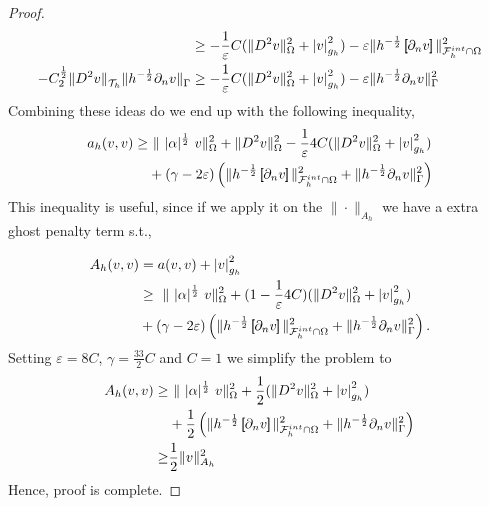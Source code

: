 \begin{proof}
\[\begin{split}
& \ge - \frac{1}{\varepsilon } C  (\| D^2 v \|_{ \Omega  }^{ 2 }  + \left\lvert  v  \right\rvert _{ g_{h} }^{2  } ) -  \varepsilon \|h^{-\frac{1}{2}} \left[\!\!\left[  \partial _{n} v  \right]\!\!\right]   \|_{ \mathcal{F}^{int}_{h}\cap \Omega   }^{2  } \\
- C_{2}^{\frac{1}{2}}  \| D^2 v \|_{ \mathcal{T} _{h} }^{  } \| h^{-\frac{1}{2}}  \partial _{n} v    \|_{ \Gamma    }^{  }
& \ge - \frac{1}{\varepsilon } C  (\| D^2 v \|_{ \Omega  }^{ 2 }  + \left\lvert  v  \right\rvert _{ g_{h} }^{2  } ) -  \varepsilon \|h^{-\frac{1}{2}}  \partial _{n} v    \|_{ \Gamma    }^{2  } \\
        \end{split}
    \]
    Combining these ideas do we end up with the following inequality,
    \[
    \begin{split}
       a_{h}( v,v)  \ge& \     \|\ |\alpha|^{\frac{1}{2}} \  v  \|_{   \Omega   }^{2} +\| D^2v  \|_{   \Omega   }^{2} -  \frac{1}{\varepsilon } 4C  (\| D^2 v \|_{ \Omega  }^{ 2 }  + \left\lvert  v  \right\rvert _{ g_{h} }^{2  } )  \\
                       & + (\gamma - 2\varepsilon  )\left( \|h^{-\frac{1}{2}}  \left[\!\!\left[  \partial _{n} v  \right]\!\!\right]\|_{\mathcal{F} _{h}^{int} \cap \Omega   }^{ 2 } + \| h^{-\frac{1}{2}} \partial _{n} v \|_{ \Gamma  }^{ 2} \right)        \\
    \end{split}
    \]
    This inequality is useful, since if we apply it on the $\| \cdot  \|_{ A_{h} }^{  } $ we have a extra ghost penalty term s.t.,

    \[
        \begin{split}
     A_{h}( v,v) & = a( v,v) + \left\lvert  v  \right\rvert_{g_{h}}^{2} \\
     &\ge  \   \| \ |\alpha|^{\frac{1}{2}} \  v  \|_{   \Omega   }^{2} + (1  - \frac{1}{\varepsilon } 4C)  (\| D^2 v \|_{ \Omega  }^{ 2 }  + \left\lvert  v  \right\rvert _{ g_{h} }^{2  } )  \\
                       & + (\gamma - 2\varepsilon  )\left( \|h^{-\frac{1}{2}}  \left[\!\!\left[  \partial _{n} v  \right]\!\!\right]\|_{\mathcal{F} _{h}^{int}\cap \Omega   }^{ 2 } + \| h^{-\frac{1}{2}} \partial _{n} v \|_{ \Gamma  }^{ 2} \right)        .
        \end{split}
    \]
    Setting $\varepsilon = 8C$, $\gamma = \frac{33}{2} C$ and $C=1$  we simplify the problem to \[
        \begin{split}
           A_{h}( v,v)  \ge& \   \| \ |\alpha|^{\frac{1}{2}} \    v  \|_{  \Omega   }^{2} + \frac{1}{2}  (\| D^2 v \|_{ \Omega  }^{ 2 }  + \left\lvert  v  \right\rvert _{ g_{h} }^{2  } )  \\
                       & + \frac{1}{2}\left( \|h^{-\frac{1}{2}}  \left[\!\!\left[  \partial _{n} v  \right]\!\!\right]\|_{\mathcal{F} _{h}^{int}\cap \Omega   }^{ 2 } + \| h^{-\frac{1}{2}} \partial _{n} v \|_{ \Gamma  }^{ 2} \right) \\
                       \ge& \frac{1}{2}\| v \|_{ A_{h} }^{2  }
        \end{split}
    \]
    Hence, proof is complete.
\end{proof}


